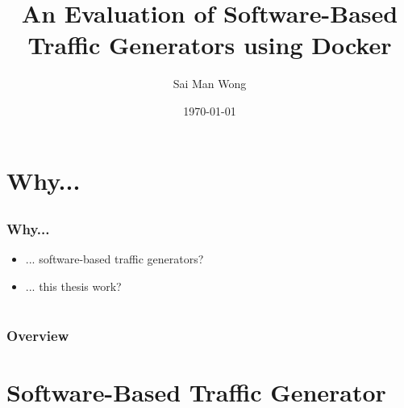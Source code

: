 \documentclass{beamer}
\title[Software-Based TG using Docker]{An Evaluation of Software-Based\\Traffic Generators using Docker} %
\author{Sai Man Wong} %
\institute[KTH] %
{
  KTH Royal Institute of Technology\\ %
  School of Computer Science and Communication\\
  \medskip
  \textit{smwong[a]kth.se} %
}
\date{\today} %
\begin{document}
\begin{frame}
  \titlepage %
\end{frame}

\section{Why...}
\subsection{}
\begin{frame}
  \frametitle{Why...}
  \begin{itemize}
    \item ... software-based traffic generators?
    \item ... this thesis work?
  \end{itemize}
\end{frame}

\section{}
\begin{frame}
  \frametitle{Overview} %
  \tableofcontents %
\end{frame}


\section{Software-Based Traffic Generator}
\end{document}
